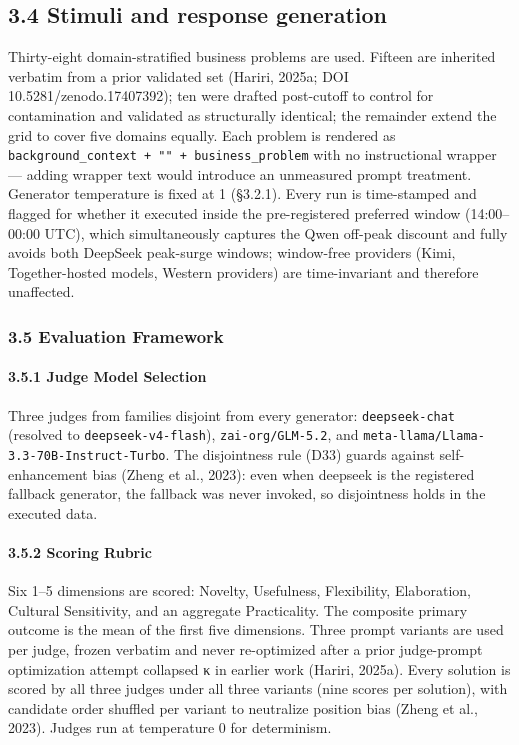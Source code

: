 \documentclass[11pt,a4paper]{article}
\begin{document}
\subsection{3.4 Stimuli and response generation}

Thirty-eight domain-stratified business problems are used. Fifteen are
inherited verbatim from a prior validated set (Hariri, 2025a; DOI
10.5281/zenodo.17407392); ten were drafted post-cutoff to control for
contamination and validated as structurally identical; the remainder
extend the grid to cover five domains equally. Each problem is rendered
as \texttt{background\_context + "\n\n" + business\_problem} with no
instructional wrapper — adding wrapper text would introduce an
unmeasured prompt treatment. Generator temperature is fixed at 1
(§3.2.1). Every run is time-stamped and flagged for whether it executed
inside the pre-registered preferred window (14:00–00:00 UTC), which
simultaneously captures the Qwen off-peak discount and fully avoids
both DeepSeek peak-surge windows; window-free providers (Kimi,
Together-hosted models, Western providers) are time-invariant and
therefore unaffected.

\subsubsection{3.5 Evaluation Framework}

\paragraph{3.5.1 Judge Model Selection}

Three judges from families disjoint from every generator:
\texttt{deepseek-chat} (resolved to \texttt{deepseek-v4-flash}), \texttt{zai-org/GLM-5.2},
and \texttt{meta-llama/Llama-3.3-70B-Instruct-Turbo}. The disjointness rule
(D33) guards against self-enhancement bias (Zheng et al., 2023): even
when deepseek is the registered fallback generator, the fallback was
never invoked, so disjointness holds in the executed data.

\paragraph{3.5.2 Scoring Rubric}

Six 1–5 dimensions are scored: \textit{}Novelty, Usefulness, Flexibility,
Elaboration, Cultural Sensitivity, and an aggregate Practicality\textit{}.
The composite primary outcome is the mean of the first five
dimensions. Three prompt variants are used per judge, frozen verbatim
and never re-optimized after a prior judge-prompt optimization attempt
collapsed κ in earlier work (Hariri, 2025a). Every solution is
scored by all three judges under all three variants (nine scores per
solution), with candidate order shuffled per variant to neutralize
position bias (Zheng et al., 2023). Judges run at temperature 0 for
determinism.
\end{document}
